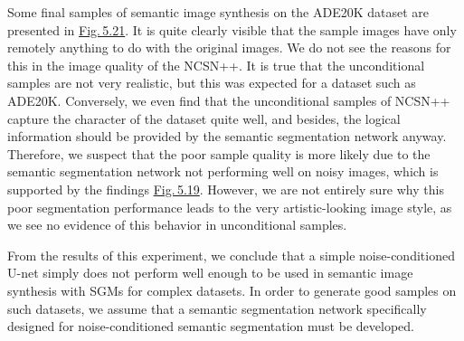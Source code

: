 Some final samples of semantic image synthesis on the ADE20K dataset are presented in \hyperref[fig:5.21]{Fig.\,5.21}. It is quite clearly visible that the sample images have only remotely anything to do with the original images. We do not see the reasons for this in the image quality of the NCSN++. It is true that the unconditional samples are not very realistic, but this was expected for a dataset such as ADE20K. Conversely, we even find that the unconditional samples of NCSN++ capture the character of the dataset quite well, and besides, the logical information should be provided by the semantic segmentation network anyway. Therefore, we suspect that the poor sample quality is more likely due to the semantic segmentation network not performing well on noisy images, which is supported by the findings \hyperref[fig:5.19]{Fig.\,5.19}. However, we are not entirely sure why this poor segmentation performance leads to the very artistic-looking image style, as we see no evidence of this behavior in unconditional samples.

From the results of this experiment, we conclude that a simple noise-conditioned U-net simply does not perform well enough to be used in semantic image synthesis with SGMs for complex datasets. In order to generate good samples on such datasets, we assume that a semantic segmentation network specifically designed for noise-conditioned semantic segmentation must be developed.

